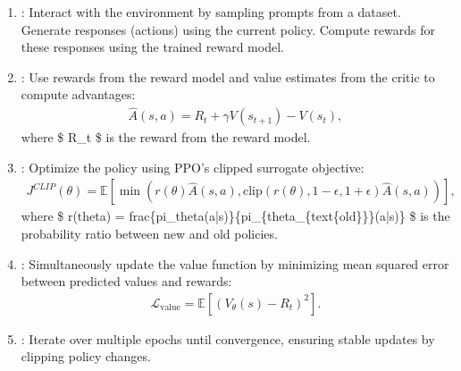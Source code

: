 \documentclass[letterpaper,11pt,english]{sphinxmanual}
\begin{document}
\begin{enumerate}
\begin{enumerate}
\begin{itemize}
\item {} 
\sphinxAtStartPar
Both the actor and critic can be initialized from the same
pre\sphinxhyphen{}trained LLM weights to leverage shared knowledge from
pretraining. However, their roles diverge during fine\sphinxhyphen{}tuning:
The actor focuses on generating responses. The critic focuses on
evaluating those responses.

\end{itemize}

\item {} 
\sphinxAtStartPar
{}: Interact with the environment by sampling
prompts from a dataset. Generate responses (actions) using the
current policy. Compute rewards for these responses using the
trained reward model.

\item {} 
\sphinxAtStartPar
{}: Use rewards from the reward model
and value estimates from the critic to compute advantages:
\begin{equation*}
\begin{split}\hat{A}(s, a) = R_t + \gamma V(s_{t+1}) - V(s_t),\end{split}
\end{equation*}
\sphinxAtStartPar
where \$ R\_t \$ is the reward from the reward model.

\item {} 
\sphinxAtStartPar
{}: Optimize the policy using
PPO’s clipped surrogate objective:
\begin{equation*}
\begin{split}J^{CLIP}(\theta) = \mathbb{E}\left[\min\left(r(\theta)\hat{A}(s, a), \text{clip}(r(\theta), 1-\epsilon, 1+\epsilon)\hat{A}(s, a)\right)\right],\end{split}
\end{equation*}
\sphinxAtStartPar
where \$ r(theta) = frac\{pi\_theta(a|s)\}\{pi\_\{theta\_\{text\{old\}\}\}(a|s)\}
\$ is the probability ratio between new and old policies.

\item {} 
\sphinxAtStartPar
{}: Simultaneously update the value
function by minimizing mean squared error between predicted values
and rewards:
\begin{equation*}
\begin{split}\mathcal{L}_{\text{value}} = \mathbb{E}\left[(V_\theta(s) - R_t)^2\right].\end{split}
\end{equation*}
\item {} 
\sphinxAtStartPar
{}: Iterate over multiple epochs until convergence,
ensuring stable updates by clipping policy changes.


\end{enumerate}
\end{enumerate}
\end{document}
